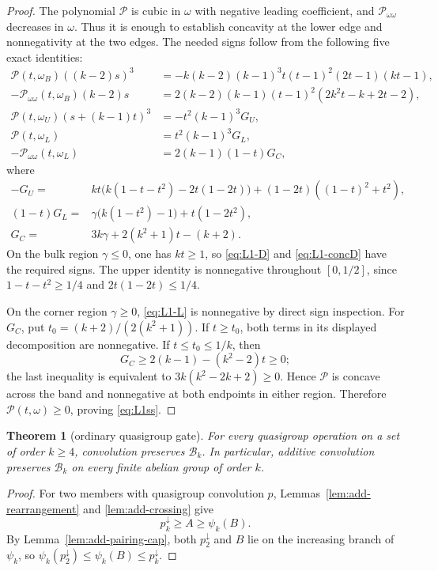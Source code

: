 \documentclass[11pt]{article}
\newtheorem{theorem}{Theorem}[section]
\theoremstyle{definition}
\theoremstyle{remark}
\newcommand{\body}{\mathcal{B}}
\newcommand{\down}{\downarrow}
\begin{document}
\begin{proof}
The polynomial $\mathcal P$ is cubic in $\omega$ with negative leading
coefficient, and $\mathcal P_{\omega\omega}$ decreases in $\omega$.  Thus
it is enough to establish concavity at the lower edge and nonnegativity
at the two edges.  The needed signs follow from the following five exact
identities:
\begin{align}
 \mathcal P(t,\omega_B)((k-2)s)^3
 &=-k(k-2)(k-1)^3t(t-1)^2(2t-1)(kt-1),\label{eq:L1-D}\\
 -\mathcal P_{\omega\omega}(t,\omega_B)(k-2)s
 &=2(k-2)(k-1)(t-1)^2(2k^2t-k+2t-2),\label{eq:L1-concD}\\
 \mathcal P(t,\omega_U)(s+(k-1)t)^3
 &=-t^2(k-1)^3G_U,\label{eq:L1-U}\\
 \mathcal P(t,\omega_L)&=t^2(k-1)^3G_L,\label{eq:L1-L}\\
 -\mathcal P_{\omega\omega}(t,\omega_L)&=2(k-1)(1-t)G_C,\label{eq:L1-concL}
\end{align}
where
\begin{align*}
 -G_U={}&kt\bigl(k(1-t-t^2)-2t(1-2t)\bigr)
 +(1-2t)((1-t)^2+t^2),\\
 (1-t)G_L={}&\gamma\bigl(k(1-t^2)-1\bigr)+t(1-2t^2),\\
 G_C={}&3k\gamma+2(k^2+1)t-(k+2).
\end{align*}
On the bulk region $\gamma\le0$, one has $kt\ge1$, so
\eqref{eq:L1-D} and \eqref{eq:L1-concD} have the required signs.  The
upper identity is nonnegative throughout $[0,1/2]$, since
$1-t-t^2\ge1/4$ and $2t(1-2t)\le1/4$.

On the corner region $\gamma\ge0$, \eqref{eq:L1-L} is nonnegative by
direct sign inspection.  For $G_C$, put
$t_0=(k+2)/(2(k^2+1))$.  If $t\ge t_0$, both terms in its displayed
decomposition are nonnegative.  If $t\le t_0\le1/k$, then
\[
 G_C\ge2(k-1)-(k^2-2)t\ge0;
\]
the last inequality is equivalent to
$3k(k^2-2k+2)\ge0$.  Hence $\mathcal P$ is concave across the band and
nonnegative at both endpoints in either region.  Therefore
$\mathcal P(t,\omega)\ge0$, proving \eqref{eq:L1ss}.
\end{proof}

\begin{theorem}[ordinary quasigroup gate]\label{thm:addition}
For every quasigroup operation on a set of order $k\ge4$, convolution
preserves $\body_k$.  In particular, additive convolution preserves
$\body_k$ on every finite abelian group of order $k$.
\end{theorem}

\begin{proof}
For two members with quasigroup convolution $p$,
Lemmas~\ref{lem:add-rearrangement} and
\ref{lem:add-crossing} give
\[
 p_k^\down\ge A\ge\psi_k(B).
\]
By Lemma~\ref{lem:add-pairing-cap}, both $p_2^\down$ and $B$ lie on the
increasing branch of $\psi_k$, so
$\psi_k(p_2^\down)\le\psi_k(B)\le p_k^\down$.
\end{proof}
\end{document}
